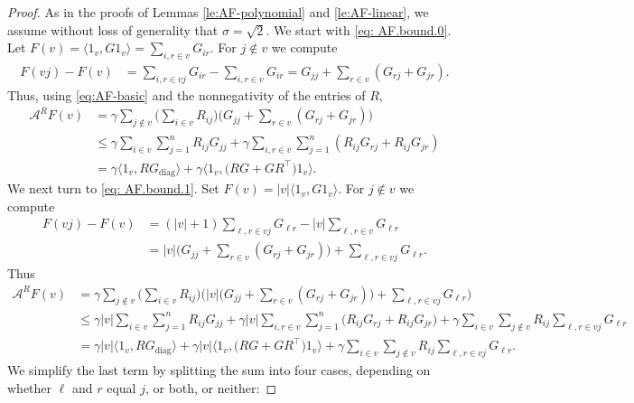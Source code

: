 \documentclass[10pt,a4paper]{amsart}
\def\A{{\mathcal A}}
\begin{document}
\begin{proof} 
As in the proofs of Lemmas \ref{le:AF-polynomial} and \ref{le:AF-linear}, we assume without loss of generality that $\sigma = \sqrt{2}$. We start with \eqref{eq: AF.bound.0}. Let $F(v) = \langle 1_v, G1_v\rangle = \sum_{i,r \in v}G_{ir}$. 	For $j \notin v$ we compute
		\begin{align*}
			F(vj) - F(v) &= \sum_{i,r \in vj}G_{ir} - \sum_{i,r \in v}G_{ir} = G_{jj} + \sum_{r \in v}(G_{rj} + G_{jr}).
		\end{align*}
		Thus, using \eqref{eq:AF-basic} and the nonnegativity of the entries of $R$,
		\begin{align*}
			\A^{R} F(v) &=  \gamma \sum_{j \notin v}\bigg(\sum_{i \in v} R_{ij}\bigg)\bigg(G_{jj} + \sum_{r \in v}(G_{rj} + G_{jr})\bigg) \\
			&\le \gamma \sum_{i \in v}\sum_{j=1}^n R_{ij}G_{jj} + \gamma \sum_{i,r \in v} \sum_{j =1}^n (R_{ij}G_{rj} + R_{ij}G_{jr}) \\
			&= \gamma \langle 1_v , R G_{\mathrm{diag}}\rangle  + \gamma  \langle 1_v, \big( R G +GR^\top \big) 1_v\rangle .
		\end{align*} 
	We next turn to \eqref{eq: AF.bound.1}. Set $F(v)=|v|\langle 1_v, G1_v\rangle$. For $j \notin v$ we compute  
		\begin{align*}
			F(vj) - F(v) &= (|v| +1)\sum_{\ell, r\in vj}G_{\ell r} -  |v| \sum_{\ell, r\in v}G_{\ell r} \\
			&= |v| \bigg(G_{jj} + \sum_{r \in v}(G_{rj} + G_{jr})\bigg) + \sum_{\ell, r\in vj} G_{\ell r}.
		\end{align*}
		Thus
		\begin{align*}
			\A^{R}  F(v) &= \gamma \sum_{j \notin v}\bigg(\sum_{i \in v} R_{ij}\bigg)\bigg(  |v| \bigg(G_{jj} + \sum_{r \in v}(G_{rj} + G_{jr})\bigg) + \sum_{\ell, r\in vj} G_{\ell r} \bigg) \\
			&\le \gamma  |v|  \sum_{i \in v}\sum_{j=1}^n R_{ij}G_{jj} + \gamma  |v| \sum_{i,r \in v} \sum_{j =1}^n \Big(R_{ij}G_{rj} + R_{ij}G_{jr}\Big) 
			+ \gamma \sum_{i\in v}\sum_{j \notin  v} R_{ij} \sum_{\ell, r\in vj} G_{\ell r}  \\
			&= \gamma |v|  \langle 1_v, R G_{\mathrm{diag}}\rangle  + \gamma |v|  \langle 1_v, \big( R G +GR^\top \big) 1_v\rangle + \gamma \sum_{i\in v}\sum_{j\notin  v} R_{ij} \sum_{\ell, r\in vj} G_{\ell r}.
		\end{align*}
		We simplify the last term by splitting the sum into four cases, depending on whether $\ell$ and $r$ equal $j$, or both, or neither:

\end{proof}
\end{document}
